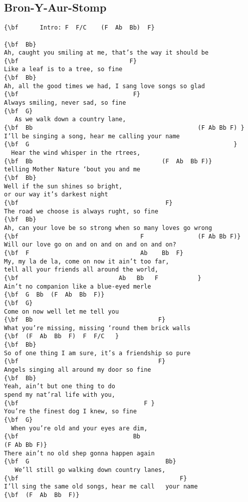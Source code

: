 \documentclass[a4paper]{article}
\begin{document}
\subsection{Bron-Y-Aur-Stomp}
\begin{Verbatim}[commandchars=\\\{\}]
{\bf  	  Intro: F  F/C    (F  Ab  Bb)  F}

{\bf  Bb}
Ah, caught you smiling at me, that’s the way it should be
{\bf                               F}
Like a leaf is to a tree, so fine
{\bf  Bb}
Ah, all the good times we had, I sang love songs so glad
{\bf                                F}
Always smiling, never sad, so fine
{\bf  G}
   As we walk down a country lane, 
{\bf  Bb                                              (F Ab Bb F) }
I’ll be singing a song, hear me calling your name
{\bf  G                                                         }
  Hear the wind whisper in the rtrees, 
{\bf  Bb                                    (F  Ab  Bb F)}
telling Mother Nature ‘bout you and me
{\bf  Bb}
Well if the sun shines so bright, 
or our way it’s darkest night
{\bf                                         F}
The road we choose is always rught, so fine
{\bf  Bb}
Ah, can your love be so strong when so many loves go wrong 
{\bf                                  F               (F Ab Bb F)}
Will our love go on and on and on and on and on?
{\bf  F                               Ab    Bb  F}
My, my la de la, come on now it ain’t too far, 
tell all your friends all around the world,
{\bf                            Ab   Bb   F           }
Ain’t no companion like a blue-eyed merle
{\bf  G  Bb  (F  Ab  Bb  F)}
{\bf  G}
Come on now well let me tell you
{\bf  Bb                                   F}
What you’re missing, missing ‘round them brick walls
{\bf  (F  Ab  Bb  F)  F  F/C   }
{\bf  Bb}
So of one thing I am sure, it’s a friendship so pure
{\bf                                       F}
Angels singing all around my door so fine
{\bf  Bb}
Yeah, ain’t but one thing to do 
spend my nat’ral life with you,
{\bf                                   F }
You’re the finest dog I knew, so fine
{\bf  G}
  When you’re old and your eyes are dim,
{\bf                                Bb                                        (F Ab Bb F)}
There ain’t no old shep gonna happen again
{\bf  G                                      Bb}
   We’ll still go walking down country lanes, 
{\bf                                             F}
I’ll sing the same old songs, hear me call   your name
{\bf  (F  Ab  Bb  F)}

\end{Verbatim}
\newpage
\end{document}
